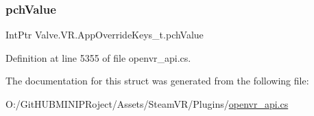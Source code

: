 \subsubsection{\texorpdfstring{pchValue}{pchValue}}
{\footnotesize\ttfamily Int\+Ptr Valve.\+V\+R.\+App\+Override\+Keys\+\_\+t.\+pch\+Value}



Definition at line 5355 of file openvr\+\_\+api.\+cs.



The documentation for this struct was generated from the following file\+:\begin{DoxyCompactItemize}
\item 
O\+:/\+Git\+H\+U\+B\+M\+I\+N\+I\+P\+Roject/\+Assets/\+Steam\+V\+R/\+Plugins/\mbox{\hyperlink{openvr__api_8cs}{openvr\+\_\+api.\+cs}}\end{DoxyCompactItemize}
